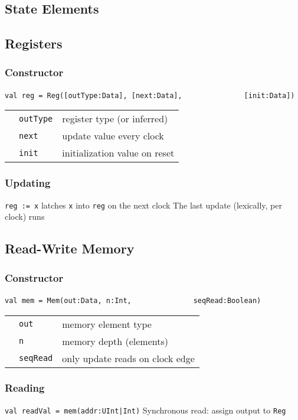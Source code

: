 \documentclass[10pt,landscape]{article}
\begin{document}
\begin{multicols}{3}
\section{State Elements}
\subsection{Registers}
\subsubsection{Constructor}
\verb$val reg = Reg([outType:Data], [next:Data],$ \newline
\verb$              [init:Data])$ \newline
\begin{tabular}{l l l}
& \verb$outType$ & register type (or inferred) \\
& \verb$next$ & update value every clock \\
& \verb$init$ & initialization value on reset \\
\end{tabular}
\subsubsection{Updating}
\verb$reg := x$ latches \verb$x$ into \verb$reg$ on the next clock \newline
The last update (lexically, per clock) runs

\subsection{Read-Write Memory}
\subsubsection{Constructor}
\verb$val mem = Mem(out:Data, n:Int,$ \newline
\verb$              seqRead:Boolean)$ \newline
\begin{tabular}{l l l}
& \verb$out$ & memory element type \\
& \verb$n$ & memory depth (elements) \\
& \verb$seqRead$ & only update reads on clock edge \\
\end{tabular}
\subsubsection{Reading}
\verb$val readVal = mem(addr:UInt|Int)$ \newline
Synchronous read: assign output to \verb$Reg$

\end{multicols}
\end{document}
